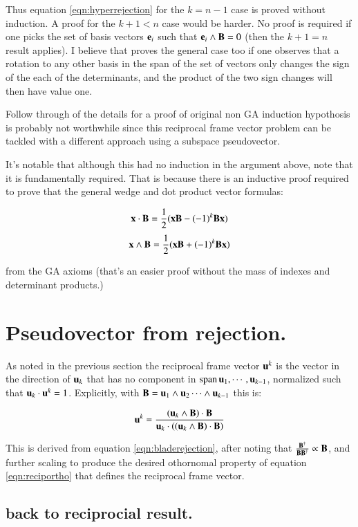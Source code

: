 \documentclass{article}      %
\begin{document}
Thus equation \ref{eqn:hyperrejection} for the $k = n-1$ case is proved without induction.  A proof for the $k+1<n$ case would be harder.
No proof is required if one picks the set of basis vectors ${\mathbf{e}_i}$ such that $\mathbf{e}_i \wedge \mathbf{B} = 0$ (then the $k+1=n$ result applies).
I believe that proves the general case too if one observes that a rotation to any other basis in the span of the set of vectors only
changes the sign of the each of the determinants, and the product of the two sign changes will then have value one.

Follow through of the details for a proof of original non GA induction hypothosis is probably not worthwhile since this
reciprocal frame vector problem can be
tackled with a different approach using a subspace pseudovector.

It's notable that although this had no induction in the argument above, note that it is fundamentally required.
That is because there is an inductive proof
required to prove that the general wedge and dot product vector formulas:

\[
\mathbf{x} \cdot \mathbf{B} = \frac{1}{2}(\mathbf{x} \mathbf{B} - (-1)^k\mathbf{B} \mathbf{x})
\]
\[
\mathbf{x} \wedge \mathbf{B} = \frac{1}{2}(\mathbf{x} \mathbf{B} + (-1)^k\mathbf{B} \mathbf{x})
\]

from the GA axioms (that's an easier proof without the mass of indexes and determinant products.) 

\section{ Pseudovector from rejection. }

As noted in the previous section the reciprocal frame vector $\mathbf{u}^k$ is the vector in the direction of $\mathbf{u}_k$ that has no component
in $\operatorname{span}{ \mathbf{u}_1, \cdots, \mathbf{u}_{k-1}}$, normalized such that $\mathbf{u}_k \cdot \mathbf{u}^k = 1$.  Explicitly, with
$\mathbf{B} = \mathbf{u}_1 \wedge \mathbf{u}_2 \cdots \wedge \mathbf{u}_{k-1}$ this is:

\begin{equation}\label{eqn:reciprej}
\mathbf{u}^k = 
\frac
{
(\mathbf{u}_k \wedge \mathbf{B}) \cdot \mathbf{B}
}
{
\mathbf{u}_k \cdot \left((\mathbf{u}_k \wedge \mathbf{B}) \cdot \mathbf{B}\right)
}
\end{equation}

This is derived from equation \ref{eqn:bladerejection}, after noting that
$\frac{\mathbf{B}^\dagger}{\mathbf{B}\mathbf{B}^\dagger} \propto \mathbf{B}$, and further
scaling to produce the desired othornomal property of equation
\ref{eqn:reciportho}
that defines the reciprocal frame vector.

\subsection{ back to reciprocial result. }
\end{document}

